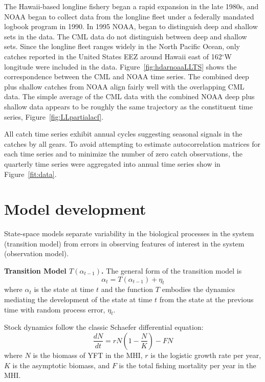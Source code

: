 \documentclass[12pt,letterpaper]{article}
\renewcommand\deg[1]{$^\circ$#1}
\begin{document}
The Hawaii-based longline fishery began a rapid expansion in the late
1980s, and NOAA began to collect data from the longline fleet under a
federally mandated logbook program in 1990.
In 1995 NOAA, began to distinguish deep and shallow sets in the data. 
The CML data do not distinguish between deep and shallow sets.
Since the longline fleet ranges widely in the North Pacific Ocean,
only catches reported in the United States EEZ around Hawaii east of
162\deg{W} longitude were included in the data.
Figure~\ref{fig:hdarnoaaLLTS} shows the correspondence between the
CML and NOAA time series. The combined deep plus shallow catches from
NOAA align fairly well with the overlapping CML data. The simple
average of the CML data with the combined NOAA deep plus shallow data
appears to be roughly the same trajectory as the
constituent time series, Figure~\ref{fig:LLpartialacf}.


All catch time series exhibit annual cycles suggesting seasonal
signals in the catches by all gears. To avoid attempting to estimate
autocorrelation matrices for each time series and to minimize the
number of zero catch observations, the quarterly time series were
aggregated into annual time series show in Figure~\ref{fit:data}.

\section*{Model development}
\label{sec:models}
State-space models separate variability in the biological
processes in the system (transition model)
from errors in observing features of interest
in the system (observation model).

{\bf Transition Model $T(\alpha_{t-1})$.}
The general form of the transition model is
\begin{equation}
\alpha_t=T(\alpha_{t-1}) + \eta_t
\end{equation}
where $\alpha_t$ is the state at time $t$ and 
the function $T$ embodies the dynamics mediating the
development of the state at time $t$ from the state at the previous
time with random process error, $\eta_t$.

Stock dynamics follow the classic Schaefer differential equation:
\begin{equation}
\label{eqn:ischaefer}
\frac{dN}{dt} = rN(1-\frac{N}{K}) - FN
\end{equation}
where $N$ is the biomass of YFT in the MHI, 
$r$ is the logistic growth rate per year,
$K$ is the asymptotic biomass, and
$F$ is the total fishing mortality per year in the MHI.
\end{document}
